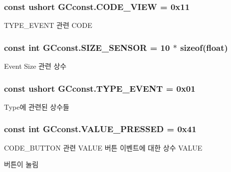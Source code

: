 \subsubsection[{C\+O\+D\+E\+\_\+\+V\+I\+E\+W}]{\setlength{\rightskip}{0pt plus 5cm}const ushort G\+Cconst.\+C\+O\+D\+E\+\_\+\+V\+I\+E\+W = 0x11}\label{class_g_cconst_a33241116bb534c10ba1a5400547a74b0}
T\+Y\+P\+E\+\_\+\+E\+V\+E\+N\+T 관련 C\+O\+D\+E \hypertarget{class_g_cconst_a13a353e3da52e3a0454487664c360dab}{}
\subsubsection[{S\+I\+Z\+E\+\_\+\+S\+E\+N\+S\+O\+R}]{\setlength{\rightskip}{0pt plus 5cm}const int G\+Cconst.\+S\+I\+Z\+E\+\_\+\+S\+E\+N\+S\+O\+R = 10 $\ast$ sizeof(float)}\label{class_g_cconst_a13a353e3da52e3a0454487664c360dab}
Event Size 관련 상수 \hypertarget{class_g_cconst_a5653aff2918dd19b3ed466d054916b51}{}
\subsubsection[{T\+Y\+P\+E\+\_\+\+E\+V\+E\+N\+T}]{\setlength{\rightskip}{0pt plus 5cm}const ushort G\+Cconst.\+T\+Y\+P\+E\+\_\+\+E\+V\+E\+N\+T = 0x01}\label{class_g_cconst_a5653aff2918dd19b3ed466d054916b51}
Type에 관련된 상수들 \hypertarget{class_g_cconst_ab29addae403721e28db58d3d588d7cb6}{}
\subsubsection[{V\+A\+L\+U\+E\+\_\+\+P\+R\+E\+S\+S\+E\+D}]{\setlength{\rightskip}{0pt plus 5cm}const int G\+Cconst.\+V\+A\+L\+U\+E\+\_\+\+P\+R\+E\+S\+S\+E\+D = 0x41}\label{class_g_cconst_ab29addae403721e28db58d3d588d7cb6}
C\+O\+D\+E\+\_\+\+B\+U\+T\+T\+O\+N 관련 V\+A\+L\+U\+E 버튼 이벤트에 대한 상수 V\+A\+L\+U\+E

버튼이 눌림 \hypertarget{class_g_cconst_ae71573553c10f6fa0dce4c8ef2a27e10}{}
